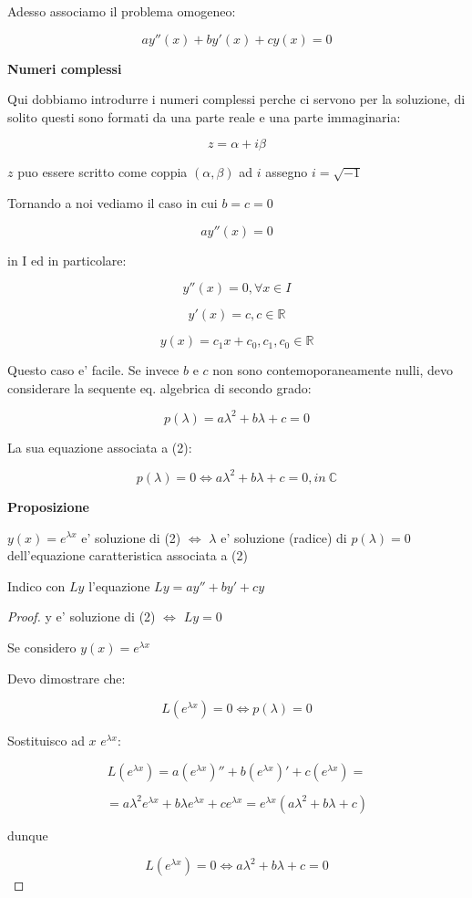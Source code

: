 \documentclass[11pt]{article}
\begin{document}
Adesso associamo il problema omogeneo:

\[
    ay''(x) + by'(x) + cy(x) = 0
\]

\textbf{Numeri complessi} 

Qui dobbiamo introdurre i numeri complessi perche ci servono per la soluzione, di solito questi sono formati da una parte reale e una parte immaginaria:

\[
    z = \alpha + i\beta
\]

$z$ puo essere scritto come coppia $(\alpha,\beta)$ ad $i$ assegno $i=\sqrt{-1}$

Tornando a noi vediamo il caso in cui $b=c=0$

\[
    ay''(x) = 0
\]

in I ed in particolare:

\[
    y''(x) = 0, \forall x \in I
\]

\[
    y'(x) = c, c \in \mathbb{R}
\]

\[
    y(x) = c_1x+c_0,c_1,c_0 \in \mathbb{R}
\]

Questo caso e' facile. Se invece $b$ e $c$ non sono contemoporaneamente nulli, devo considerare la sequente eq. algebrica di secondo grado:

\[
    p(\lambda) = a \lambda^{2}+b \lambda + c =0
\]

La sua equazione associata a (2):

\[
    p(\lambda) =0 \Leftrightarrow  a \lambda^{2}+b \lambda + c =0, in\ \mathbb{C}
\]



\textbf{Proposizione} 

$y(x) = e ^{\lambda x}$ e' soluzione di (2) $\Leftrightarrow $ $\lambda$ e' soluzione (radice) di $p(\lambda)=0$ dell'equazione caratteristica associata a (2)

Indico con $Ly$ l'equazione $Ly= ay''+by'+cy$

\begin{proof}
    y e' soluzione di (2) $\Leftrightarrow$ $Ly=0$ 

    Se considero $y(x) = e ^{\lambda x}$ 

    Devo dimostrare che:

    \[
        L(e ^{\lambda x}) = 0 \Leftrightarrow  p(\lambda) = 0
    \]

    Sostituisco ad $x$ $e ^{\lambda x}$:

    \[
        L(e ^{\lambda x}) = a( e^{\lambda x})'' + b( e ^{\lambda x})' + c(e ^{\lambda x}) =
    \]

    \[
        =a \lambda ^{2} e ^{\lambda x} + b \lambda e ^{\lambda x} + c e^{\lambda x}= e ^{\lambda x}(a \lambda ^{2}+ b \lambda+ c)
    \]

    dunque

    \[
        L( e ^{\lambda x}) = 0 \Leftrightarrow a \lambda ^{2}+ b \lambda +c = 0 
    \]
           
\end{proof}
\end{document}
